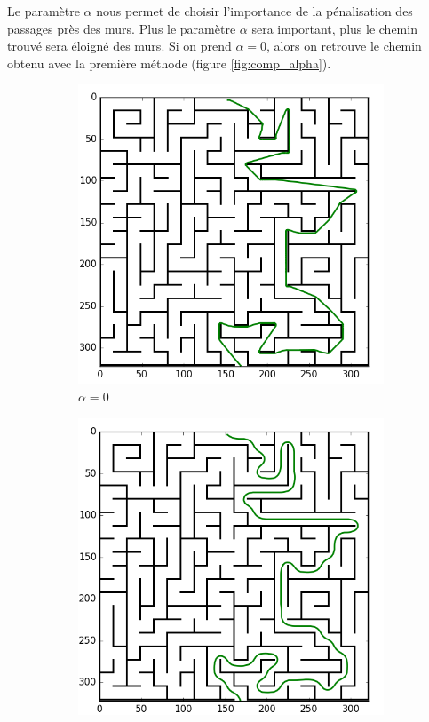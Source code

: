 \documentclass{article}
\begin{document}
Le paramètre $\alpha$ nous permet de choisir l'importance de la pénalisation des passages près des murs. Plus le paramètre $\alpha$ sera important, plus le chemin trouvé sera éloigné des murs. Si on prend $\alpha=0$, alors on retrouve le chemin obtenu avec la première méthode (figure \ref{fig:comp_alpha}).

\begin{figure}
	\centering
	\begin{subfigure}[b]{0.3\textwidth}
		\centering
		\includegraphics[width=\textwidth]{../result/maze_C0.png}
		\caption{$\alpha=0$}
		\label{fig:y equals x}
	\end{subfigure}
	\hfill
	\begin{subfigure}[b]{0.3\textwidth}
		\centering
		\includegraphics[width=\textwidth]{../result/maze_C05.png}

\end{subfigure}
\end{figure}
\end{document}
